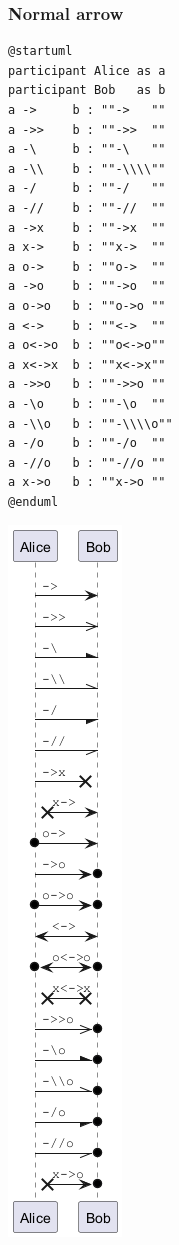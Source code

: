 \subsubsection{Normal arrow}
\begin{verbatim}
@startuml
participant Alice as a
participant Bob   as b
a ->     b : ""->   ""
a ->>    b : ""->>  ""
a -\     b : ""-\   ""
a -\\    b : ""-\\\\""
a -/     b : ""-/   ""
a -//    b : ""-//  ""
a ->x    b : ""->x  ""
a x->    b : ""x->  ""
a o->    b : ""o->  ""
a ->o    b : ""->o  ""
a o->o   b : ""o->o ""
a <->    b : ""<->  ""
a o<->o  b : ""o<->o""
a x<->x  b : ""x<->x""
a ->>o   b : ""->>o ""
a -\o    b : ""-\o  ""
a -\\o   b : ""-\\\\o""
a -/o    b : ""-/o  ""
a -//o   b : ""-//o ""
a x->o   b : ""x->o ""
@enduml
\end{verbatim}
\begin{center}
\includegraphics[scale=0.60]{imgw/img-a14004de730c5a460d924597e0da9115.png}
\end{center}


